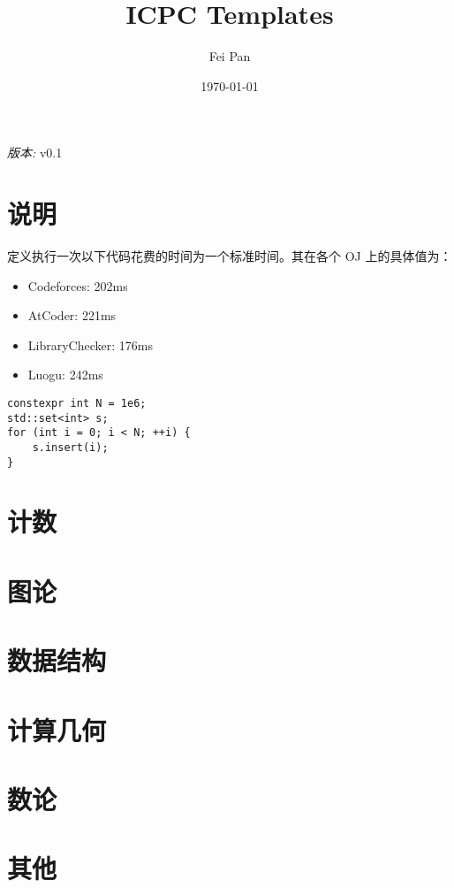 \documentclass[12pt]{ctexart}
\title{ICPC Templates}
\date{\today}
\author{Fei Pan}
\newcommand{\version}{v0.1}
\begin{document}
\maketitle
\begin{center}
    \textit{版本: }\version
\end{center}

\tableofcontents
\newpage

\section{说明}

定义执行一次以下代码花费的时间为一个标准时间。其在各个 OJ 上的具体值为：

\begin{itemize}
\item Codeforces: 202ms
\item AtCoder: 221ms
\item LibraryChecker: 176ms
\item Luogu: 242ms
\end{itemize}
\begin{lstlisting}
constexpr int N = 1e6;
std::set<int> s;
for (int i = 0; i < N; ++i) {
    s.insert(i);
}
\end{lstlisting}
\newpage

\section{计数}



\section{图论}



\section{数据结构}


\section{计算几何}




\section{数论}



\section{其他}


\end{document}
